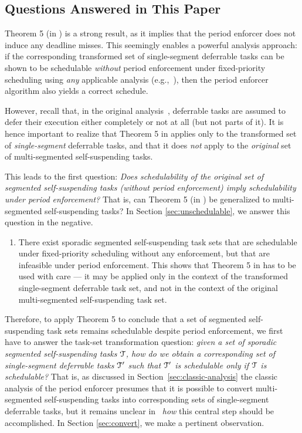 \subsection{Questions Answered in This Paper}
\label{sec:questions}

Theorem 5 (in \cite{Raj:suspension1991}) is a strong result, as it implies that the period enforcer does not induce any deadline misses. This seemingly enables a powerful analysis approach: if the corresponding transformed set of single-segment deferrable tasks can be shown to be schedulable  \emph{without} period enforcement under fixed-priority scheduling using \emph{any} applicable analysis (e.g.,~\cite{ABRTW:93}), then the period enforcer algorithm also yields a correct schedule. 

However, recall that, in the original analysis~\cite{Raj:suspension1991}, deferrable tasks are assumed to defer their  execution either completely or not at all (but not parts of it). It is hence important to realize that Theorem 5 in \cite{Raj:suspension1991} applies only to the transformed set of \emph{single-segment} deferrable tasks, and that it does \emph{not} apply to the \emph{original} set of multi-segmented self-suspending tasks. 

This leads to the first question: \emph{Does schedulability of the  original set of segmented self-suspending tasks (without period enforcement) imply schedulability under period enforcement?} That is, can Theorem 5 (in \cite{Raj:suspension1991}) be generalized to multi-segmented self-suspending tasks? In Section \ref{sec:unschedulable}, we answer this question in the negative.

\begin{enumerate}
	\item There exist sporadic segmented self-suspending task sets that are schedulable under fixed-priority scheduling without any enforcement, but that are infeasible under period enforcement. This shows that Theorem 5 in \cite{Raj:suspension1991} has to be  used with care --- it may be applied only in the context of the transformed single-segment deferrable task set, and not in the context of the original multi-segmented self-suspending task set.
\end{enumerate}


Therefore, to apply Theorem 5 to conclude that a set of segmented self-suspending task sets remains schedulable despite period enforcement, we first have to answer the task-set transformation question: \emph{given a set of sporadic segmented self-suspending tasks $\mathcal{T}$, how do we obtain a corresponding set of single-segment deferrable tasks $\mathcal{T}'$ such that $\mathcal{T}'$ is schedulable  only if $\mathcal{T}$ is schedulable?} That is, as discussed in Section~\ref{sec:classic-analysis} the classic analysis of the period enforcer \cite{Raj:suspension1991} presumes that it is possible to convert multi-segmented self-suspending tasks into corresponding sets of single-segment deferrable tasks, but it remains unclear in~\cite{Raj:suspension1991}  \emph{how} this central step should be accomplished. In Section \ref{sec:convert}, we make a pertinent observation.

